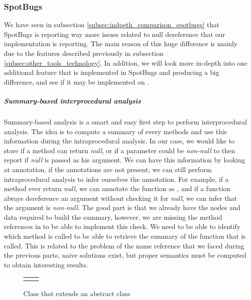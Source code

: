 \subsubsection{SpotBugs}
\label{subsec:spotbugs_specific}

We have seen in subsection \ref{subsec:indpeth_comparison_spotbugs} that SpotBugs is reporting way more issues related to null dereference that our implementation is reporting.
The main reason of this huge difference is mainly due to the features described previously in subsection \ref{subsec:other_tools_technology}.
In addition, we will look more in-depth into one additional feature that is implemented in SpotBugs and producing a big difference, and see if it may be implemented on \slang{}.

\subparagraph{Summary-based interprocedural analysis}
Summary-based analysis is a smart and easy first step to perform interprocedural analysis.
The idea is to compute a summary of every methods and use this information during the intraprocedural analysis. 
In our case, we would like to store if a method can return \emph{null}, or if a parameter could be \emph{non-null} to then report if \emph{null} is passed as his argument.
We can have this information by looking at annotation, if the annotations are not present, we can still perform intraprocedural analysis to infer ourselves the annotation. 
For example, if a method ever return \emph{null}, we can annotate the function as \nullable{}, and if a function always dereference an argument without checking it for \emph{null}, we can infer that the argument is \emph{non-null}. 
The good part is that we already have the nodes and data required to build the summary, however, we are missing the method references in \slang{} to be able to implement this check.
We need to be able to identify which method is called to be able to retrieve the summary of the function that is called.
This is related to the problem of the name reference that we faced during the previous parts, naive solutions exist, but proper semantics must be computed to obtain interesting results.

\begin{figure}[H]
	\centering
	\caption{Class that extends an abstract class}
	\label{figure:class-extends-abtract}
	\setlength{\tabcolsep}{24pt}
	\begin{tabular}{cc}
		\multicolumn{1}{c}{} & \multicolumn{1}{c}{} \\
	\end{tabular}


\end{figure}

